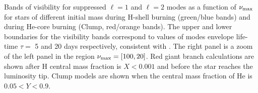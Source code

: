 \label{fig:visibility} Bands of visibility for suppressed $\ell=1$ and $\ell=2$ modes as a function of $\nu_{\rm max}$ for stars of different initial mass during H-shell burning (green/blue bands) and during He-core burning (Clump, red/orange bands). The upper and lower boundaries for the visibility bands correspond to values of modes envelope life-time $\tau=$ 5 and 20 days respectively, consistent with \cite{Dupret_2009,Corsaro_2015}. The right panel is a zoom of the left panel in the region $\nu_{\rm max} = [100,20]$. Red giant branch calculations are shown after H central mass fraction is $ X < 0.001$ and before the star reaches the luminosity tip. Clump models are shown when the central mass fraction of He is $0.05 < Y < 0.9$.

  
  
  
  
  